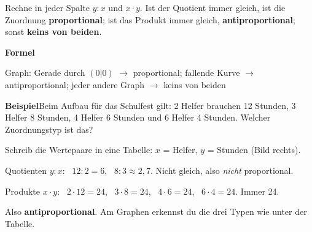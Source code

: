 \documentclass[11pt]{article}
\begin{document}
\noindent Rechne in jeder Spalte $y : x$ und $x \cdot y$. Ist der Quotient immer gleich, ist die Zuordnung \textbf{proportional}; ist das Produkt immer gleich, \textbf{antiproportional}; sonst \textbf{keins von beiden}.\par\medskip
\noindent\textbf{Formel}\par\nopagebreak\noindent\hspace*{4mm}\begin{minipage}{\dimexpr\linewidth-4mm\relax}Graph: Gerade durch $(0|0)$ $\to$ proportional; fallende Kurve $\to$ antiproportional; jeder andere Graph $\to$ keins von beiden\end{minipage}\par\medskip
\noindent\textbf{Beispiel}\quad Beim Aufbau für das Schulfest gilt: 2 Helfer brauchen 12 Stunden, 3 Helfer 8 Stunden, 4 Helfer 6 Stunden und 6 Helfer 4 Stunden. Welcher Zuordnungstyp ist das?\par\smallskip
\noindent\begin{minipage}[t]{0.6\linewidth}\vspace{0pt}\par\noindent{}Schreib die Wertepaare in eine Tabelle: $x$ = Helfer, $y$ = Stunden (Bild rechts).\par\smallskip\par\noindent{}Quotienten $y : x$: \ $12 : 2 = 6$, \ $8 : 3 \approx 2{,}7$. Nicht gleich, also \emph{nicht} proportional.\par\smallskip\par\noindent{}Produkte $x \cdot y$: \ $2 \cdot 12 = 24$, \ $3 \cdot 8 = 24$, \ $4 \cdot 6 = 24$, \ $6 \cdot 4 = 24$. Immer 24.\par\smallskip\par\noindent{}Also \textbf{antiproportional}. Am Graphen erkennst du die drei Typen wie unter der Tabelle.\par\smallskip\end{minipage}\hfill
\end{document}
